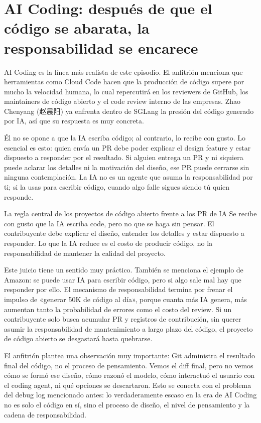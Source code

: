 \documentclass[a4paper]{article}
\begin{document}
\section{AI Coding: después de que el código se abarata, la responsabilidad se encarece}

AI Coding es la línea más realista de este episodio. El anfitrión menciona que herramientas como Cloud Code hacen que la producción de código supere por mucho la velocidad humana, lo cual repercutirá en los reviewers de GitHub, los maintainers de código abierto y el code review interno de las empresas. Zhao Chenyang (赵晨阳) ya enfrenta dentro de SGLang la presión del código generado por IA, así que su respuesta es muy concreta.

Él no se opone a que la IA escriba código; al contrario, lo recibe con gusto. Lo esencial es esto: quien envía un PR debe poder explicar el design feature y estar dispuesto a responder por el resultado. Si alguien entrega un PR y ni siquiera puede aclarar los detalles ni la motivación del diseño, ese PR puede cerrarse sin ninguna contemplación. La IA no es un agente que asuma la responsabilidad por ti; si la usas para escribir código, cuando algo falle sigues siendo tú quien responde.

\begin{importantbox}{La regla central de los proyectos de código abierto frente a los PR de IA}
Se recibe con gusto que la IA escriba code, pero no que se haga sin pensar. El contribuyente debe explicar el diseño, entender los detalles y estar dispuesto a responder. Lo que la IA reduce es el costo de producir código, no la responsabilidad de mantener la calidad del proyecto.
\end{importantbox}

Este juicio tiene un sentido muy práctico. También se menciona el ejemplo de Amazon: se puede usar IA para escribir código, pero si algo sale mal hay que responder por ello. El mecanismo de responsabilidad termina por frenar el impulso de «generar 50K de código al día», porque cuanta más IA genera, más aumentan tanto la probabilidad de errores como el costo del review. Si un contribuyente solo busca acumular PR y registros de contribución, sin querer asumir la responsabilidad de mantenimiento a largo plazo del código, el proyecto de código abierto se desgastará hasta quebrarse.

El anfitrión plantea una observación muy importante: Git administra el resultado final del código, no el proceso de pensamiento. Vemos el diff final, pero no vemos cómo se formó ese diseño, cómo razonó el modelo, cómo interactuó el usuario con el coding agent, ni qué opciones se descartaron. Esto se conecta con el problema del debug log mencionado antes: lo verdaderamente escaso en la era de AI Coding no es solo el código en sí, sino el proceso de diseño, el nivel de pensamiento y la cadena de responsabilidad.
\end{document}
